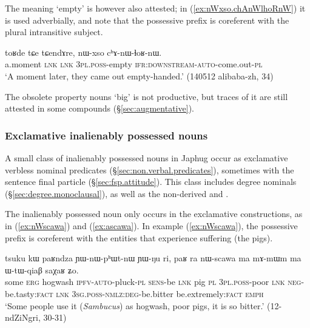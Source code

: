 The meaning `empty' is however also attested; in (\ref{ex:nWxso.chAnWlhoRnW}) it is used adverbially, and note that the possessive prefix is coreferent with the plural intransitive subject.

\begin{exe}
\ex \label{ex:nWxso.chAnWlhoRnW}
\gll toʁde tɕe tɕendɤre, nɯ-xso cʰɤ-nɯ-ɬoʁ-nɯ. \\
a.moment \textsc{lnk} \textsc{lnk} \textsc{3pl}.\textsc{poss}-empty \textsc{ifr}:\textsc{downstream}-\textsc{auto}-come.out-\textsc{pl} \\
\glt `A moment later, they came out empty-handed.' (140512 alibaba-zh, 34)
\end{exe} 

The obsolete property nouns   `big' is not productive, but traces of it are still attested in some compounds (§\ref{sec:augmentative}).

\subsubsection{Exclamative inalienably possessed nouns} \label{sec:exclamative.IPN}
A small class of inalienably possessed nouns in Japhug occur as exclamative verbless nominal predicates (§\ref{sec:non.verbal.predicates}), sometimes with the sentence final particle  (§\ref{sec:fsp.attitude}). This class includes degree nominals (§\ref{sec:degree.monoclausal}), as well as the non-derived  and . 

The inalienably possessed noun  only occurs in the exclamative constructions, as in (\ref{ex:nWscawa}) and (\ref{ex:ascawa}). In example (\ref{ex:nWscawa}), the possessive prefix is coreferent with the entities that experience suffering (the pigs).

\begin{exe}
\ex \label{ex:nWscawa} 
\gll tsuku kɯ paʁndza ɲɯ-nɯ-pʰɯt-nɯ ɲɯ-ŋu ri, paʁ ra nɯ-scawa ma mɤ-mɯm ma ɯ-tɯ-qiaβ saχaʁ ʑo. \\
some \textsc{erg} hogwash \textsc{ipfv}-\textsc{auto}-pluck-\textsc{pl} \textsc{sens}-be \textsc{lnk} pig \textsc{pl} \textsc{3pl}.\textsc{poss}-poor \textsc{lnk} \textsc{neg}-be.tasty:\textsc{fact} \textsc{lnk} \textsc{3sg}.\textsc{poss}-\textsc{nmlz}:\textsc{deg}-be.bitter be.extremely:\textsc{fact} \textsc{emph} \\
\glt `Some people use it (\textit{Sambucus}) as hogwash, poor pigs, it is so bitter.' (12-ndZiNgri, 30-31)
\end{exe}

